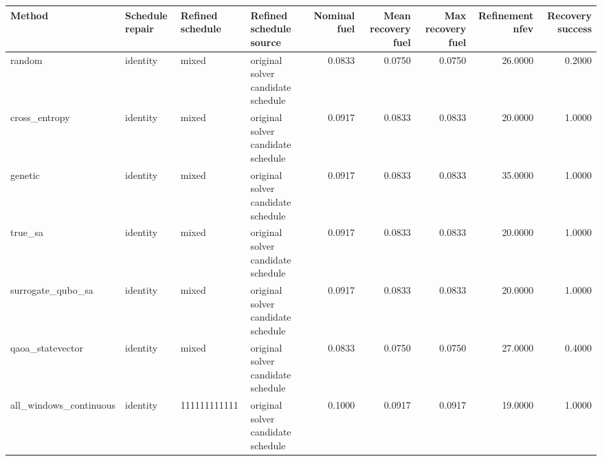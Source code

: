 \begin{tabular}{llllrrrrr}
\toprule
Method & Schedule repair & Refined schedule & Refined schedule source & Nominal fuel & Mean recovery fuel & Max recovery fuel & Refinement nfev & Recovery success \\
\midrule
random & identity & mixed & original solver candidate schedule & 0.0833 & 0.0750 & 0.0750 & 26.0000 & 0.2000 \\
cross\_entropy & identity & mixed & original solver candidate schedule & 0.0917 & 0.0833 & 0.0833 & 20.0000 & 1.0000 \\
genetic & identity & mixed & original solver candidate schedule & 0.0917 & 0.0833 & 0.0833 & 35.0000 & 1.0000 \\
true\_sa & identity & mixed & original solver candidate schedule & 0.0917 & 0.0833 & 0.0833 & 20.0000 & 1.0000 \\
surrogate\_qubo\_sa & identity & mixed & original solver candidate schedule & 0.0917 & 0.0833 & 0.0833 & 20.0000 & 1.0000 \\
qaoa\_statevector & identity & mixed & original solver candidate schedule & 0.0833 & 0.0750 & 0.0750 & 27.0000 & 0.4000 \\
all\_windows\_continuous & identity & 111111111111 & original solver candidate schedule & 0.1000 & 0.0917 & 0.0917 & 19.0000 & 1.0000 \\
\bottomrule
\end{tabular}
